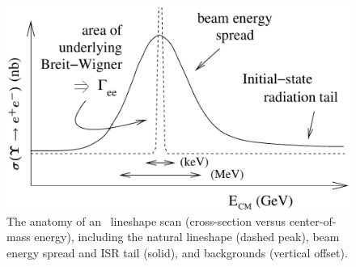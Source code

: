 \documentclass{cornell}
\begin{document}
\begin{figure}[p]
  \begin{center}
    \includegraphics[width=0.7\linewidth]{plots/cartoon}
  \end{center}
  \caption{\label{cartoon} The anatomy of an \ups\ lineshape scan
  (cross-section versus center-of-mass energy), including the natural
  lineshape (dashed peak), beam energy spread and ISR tail (solid),
  and backgrounds (vertical offset).}
\end{figure}
\end{document}
